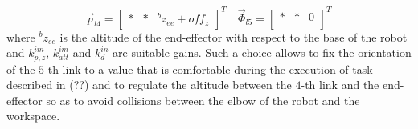 \[
\vec{p}_{l4} =
\begin{bmatrix}
  * & * & {}^{b} z_{ee} + off_z
\end{bmatrix}^{T}
\quad
\vec{\Phi}_{l5} =
\begin{bmatrix}
  * & * & 0\\
\end{bmatrix}^{T}
\]
where ${}^{b} z_{ee}$ is the altitude of the end-effector with respect to the base of the robot
and $k_{p,z}^{im}$, $k_{att}^{im}$ and $k_{d}^{in}$ are suitable gains.
Such a choice allows to fix the orientation of the $5$-th link to a value that is comfortable
during the execution of task described in (??) and to regulate the altitude between the $4$-th link and
the end-effector so as to avoid collisions between the elbow of the robot and the workspace.

